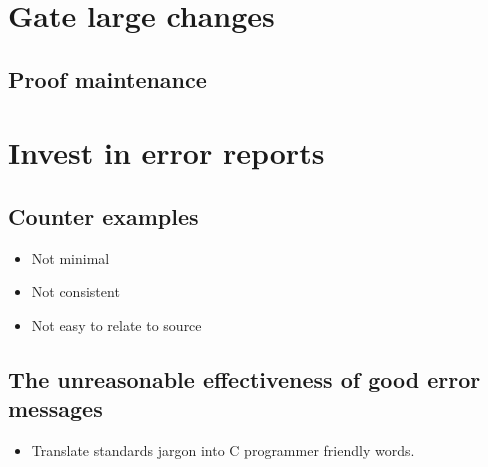 \section{Gate large changes}

\subsection{Proof maintenance}

\section{Invest in error reports}


\subsection{Counter examples}\label{sec:counter-ex}

\begin{itemize}
    \item Not minimal
    \item Not consistent
    \item Not easy to relate to source
\end{itemize}

\subsection{The unreasonable effectiveness of good error messages}\label{sec:error-msgs}

\begin{itemize}
    \item Translate standards jargon into C programmer friendly words.
\end{itemize}

